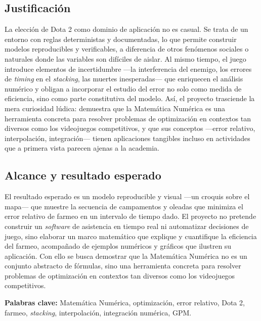 \subsection{Justificación}

La elección de Dota 2 como dominio de aplicación no es casual. Se trata de un entorno con reglas deterministas y documentadas, lo que permite construir modelos reproducibles y verificables, a diferencia de otros fenómenos sociales o naturales donde las variables son difíciles de aislar. Al mismo tiempo, el juego introduce elementos de incertidumbre ---la interferencia del enemigo, los errores de \textit{timing} en el \textit{stacking}, las muertes inesperadas--- que enriquecen el análisis numérico y obligan a incorporar el estudio del error no solo como medida de eficiencia, sino como parte constitutiva del modelo. Así, el proyecto trasciende la mera curiosidad lúdica: demuestra que la Matemática Numérica es una herramienta concreta para resolver problemas de optimización en contextos tan diversos como los videojuegos competitivos, y que sus conceptos ---error relativo, interpolación, integración--- tienen aplicaciones tangibles incluso en actividades que a primera vista parecen ajenas a la academia.

\subsection{Alcance y resultado esperado}

El resultado esperado es un modelo reproducible y visual ---un croquis sobre el mapa--- que muestre la secuencia de campamentos y oleadas que minimiza el error relativo de farmeo en un intervalo de tiempo dado. El proyecto no pretende construir un \textit{software} de asistencia en tiempo real ni automatizar decisiones de juego, sino elaborar un marco matemático que explique y cuantifique la eficiencia del farmeo, acompañado de ejemplos numéricos y gráficos que ilustren su aplicación. Con ello se busca demostrar que la Matemática Numérica no es un conjunto abstracto de fórmulas, sino una herramienta concreta para resolver problemas de optimización en contextos tan diversos como los videojuegos competitivos.

\vspace{1em}
\noindent\textbf{Palabras clave:} Matemática Numérica, optimización, error relativo, Dota 2, farmeo, \textit{stacking}, interpolación, integración numérica, GPM.
